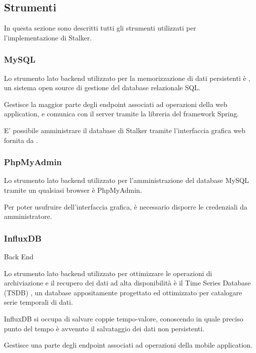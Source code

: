\documentclass[../../../manuale-sviluppatore.tex]{subfiles}
\begin{document}
\subsection{Strumenti}%
\label{sub:strumenti}
In questa sezione sono descritti tutti gli strumenti utilizzati per l'implementazione di Stalker.

\subsubsection{MySQL}%
\label{subs:mysql}
Lo strumento lato backend utilizzato per la memorizzazione di dati persistenti è , un sistema open source di gestione del database relazionale SQL\@.

Gestisce la maggior parte degli endpoint associati ad operazioni della web application, e comunica con il server tramite la libreria  del framework Spring.

E' possibile amministrare il database di Stalker tramite l'interfaccia grafica web fornita da .

\subsubsection{PhpMyAdmin}%
\label{subs:phpmyadmin}

Lo strumento lato backend utilizzato per l'amministrazione del database MySQL tramite un qualsiasi browser è PhpMyAdmin.

Per poter usufruire dell'interfaccia grafica, è necessario disporre le credenziali da amministratore.

\subsubsection{InfluxDB}%
\label{subs:influxdb}
Back End

Lo strumento lato backend utilizzato per ottimizzare le operazioni di archiviazione e il recupero dei dati ad alta disponibilità è il Time Series Database (TSDB) , un database appositamente progettato ed ottimizzato per catalogare serie temporali di dati. 

InfluxDB si occupa di salvare coppie tempo-valore, conoscendo in quale preciso punto del tempo è avvenuto il salvataggio dei dati non persistenti.

Gestisce una parte degli endpoint associati ad operazioni della mobile application. 
\end{document}
